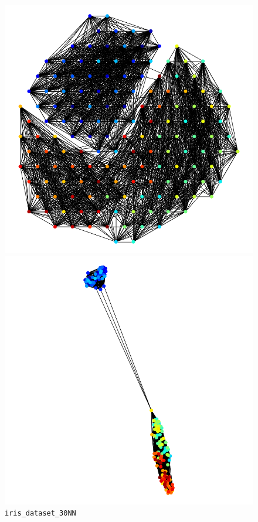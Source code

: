 \documentclass[dvipdfmx,journal]{IEEEtran}
\begin{document}
\begin{figure}[t]
    \centering
    \begin{minipage}{0.49\columnwidth}
        \centering
        \includegraphics[width=0.5\columnwidth]{overall/viz/iris_dataset_30NN_SN_L_BFGS_first.png}
    \end{minipage}
    \begin{minipage}{0.49\columnwidth}
        \centering
        \includegraphics[width=0.5\columnwidth]{overall/viz/iris_dataset_30NN_SN_L_BFGS_last.png}
    \end{minipage}
    \caption{\texttt{iris\_dataset\_30NN}}
    \label{fig:iris_dataset_30NN}
\end{figure}
\end{document}
